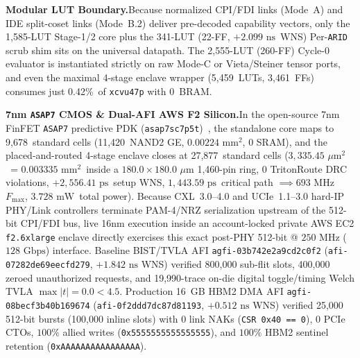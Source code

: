 \documentclass[11pt,letterpaper]{article}
\providecommand{\CoreClbLuts}{1,585}
\providecommand{\ScrubShimLuts}{341}
\providecommand{\ScrubShimFfs}{22}
\providecommand{\ScrubShimWns}{\ensuremath{+2.099\text{~ns}}}
\providecommand{\CycleZeroLuts}{2,555}
\providecommand{\CycleZeroFfs}{260}
\providecommand{\WrapperLuts}{5,459}
\providecommand{\WrapperFfs}{3,461}
\providecommand{\AwsAgfiId}{agfi-03b742e2a9cd2c0f2}
\providecommand{\AwsHbmAgfiId}{agfi-08becf3b40b169674}
\providecommand{\AwsLiveBursts}{25,000}
\providecommand{\AwsLiveSlots}{100,000}
\providecommand{\AwsBistSlots}{800,000}
\providecommand{\AsicCoreCells}{9,678}
\providecommand{\AsicCoreGe}{11,420}
\providecommand{\AsicCoreAreaMm}{\ensuremath{0.00224\text{~mm}^2}}
\providecommand{\AsicStandardCells}{27,877}
\providecommand{\AsicEnclaveAreaUm}{\ensuremath{3,335.45\text{~}\mu\text{m}^2}}
\providecommand{\AsicEnclaveAreaMm}{\ensuremath{0.003335\text{~mm}^2}}
\providecommand{\AsicStageOneTwoDelayPs}{\ensuremath{1,443.59\text{~ps}}}
\providecommand{\AsicSetupWnsPs}{\ensuremath{+2,556.41\text{~ps}}}
\providecommand{\AsicFmaxMhz}{\ensuremath{693\text{~MHz}}}
\providecommand{\AsicTotalPowerMw}{\ensuremath{3.728\text{~mW}}}
\providecommand{\CorePhysicalLUTs}{\CoreClbLuts}
\providecommand{\ScrubShimFFs}{\ScrubShimFfs}
\providecommand{\ScrubShimPhysicalLUTs}{\ScrubShimLuts}
\providecommand{\WrapperEnclaveLUTs}{\WrapperLuts}
\providecommand{\WrapperLUTUtilPct}{0.42\%}
\providecommand{\PreCoreModeCLUTs}{\CycleZeroLuts}
\providecommand{\CoreBRAM}{0}
\providecommand{\WrapperEnclaveFFs}{\WrapperFfs}
\theoremstyle{spectralthm}
\begin{document}
\noindent\textbf{Modular LUT Boundary.}\;Because normalized CPI/FDI links (Mode~A) and IDE split-coset links (Mode~B.2) deliver pre-decoded capability vectors, only the \CorePhysicalLUTs-LUT Stage-1/2 core plus the \ScrubShimPhysicalLUTs-LUT (\ScrubShimFFs-FF, \ScrubShimWns\ WNS) Per-\texttt{ARID} scrub shim sits on the universal datapath. The \PreCoreModeCLUTs-LUT (\CycleZeroFfs-FF) Cycle-0 evaluator is instantiated strictly on raw Mode-C or Vieta/Steiner tensor ports, and even the maximal 4-stage enclave wrapper (\WrapperEnclaveLUTs\ LUTs, \WrapperEnclaveFFs\ FFs) consumes just \WrapperLUTUtilPct\ of \texttt{xcvu47p} with \CoreBRAM\ BRAM.

\noindent\textbf{7nm \texttt{ASAP7} CMOS \& Dual-AFI AWS F2 Silicon.}\;In the open-source 7nm FinFET \texttt{ASAP7} predictive PDK (\texttt{asap7sc7p5t})~\cite{clark2016asap7}, the standalone core maps to \AsicCoreCells\ standard cells (\AsicCoreGe\ NAND2 GE, \AsicCoreAreaMm, $0$ SRAM), and the placed-and-routed 4-stage enclave closes at \AsicStandardCells\ standard cells (\AsicEnclaveAreaUm\ = \AsicEnclaveAreaMm\ inside a $180.0 \times 180.0\text{~}\mu\text{m}$ 1,460-pin ring, $0$ TritonRoute DRC violations, \AsicSetupWnsPs\ setup WNS, \AsicStageOneTwoDelayPs\ critical path $\implies \AsicFmaxMhz$ $F_{\max}$, \AsicTotalPowerMw\ total power). Because \mbox{CXL~3.0--4.0} and \mbox{UCIe~1.1--3.0} hard-IP PHY/Link controllers terminate PAM-4/NRZ serialization upstream of the 512-bit CPI/FDI bus, live 16nm execution inside an account-locked private AWS EC2 \texttt{f2.6xlarge} enclave directly exercises this exact post-PHY 512-bit @ $250\text{~MHz}$ ($128\text{~Gbps}$) interface. Baseline BIST/TVLA AFI \texttt{\AwsAgfiId} (\texttt{afi-07282de69eecfd279}, $+1.842\text{~ns}$ WNS) verified \AwsBistSlots{} sub-flit slots, 400,000 zeroed unauthorized requests, and 19,990-trace on-die digital toggle/timing Welch TVLA $\max|t| = 0.0 < 4.5$. Production 16~GB HBM2 DMA AFI \texttt{\AwsHbmAgfiId} (\texttt{afi-0f2ddd7dc87d81193}, $+0.512\text{~ns}$ WNS) verified \AwsLiveBursts{} 512-bit bursts (\AwsLiveSlots{} inline slots) with $0$ link NAKs (\texttt{CSR~0x40 == 0}), $0$ PCIe CTOs, $100\%$ allied writes (\texttt{0x5555555555555555}), and $100\%$ HBM2 sentinel retention (\texttt{0xAAAAAAAAAAAAAAAA}).
\end{document}
